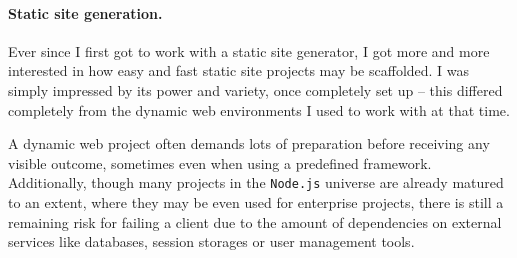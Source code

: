 \paragraph{Static site generation.}
Ever since I first got to work with a static site generator, I got more and more interested in how easy and fast static site projects may be scaffolded. I was simply impressed by its power and variety, once completely set up -- this differed completely from the dynamic web environments I used to work with at that time.

A dynamic web project often demands lots of preparation before receiving any visible outcome, sometimes even when using a predefined framework. Additionally, though many projects in the \texttt{Node.js} universe are already matured to an extent, where they may be even used for enterprise projects, there is still a remaining risk for failing a client due to the amount of dependencies on external services like databases, session storages or user management tools.




